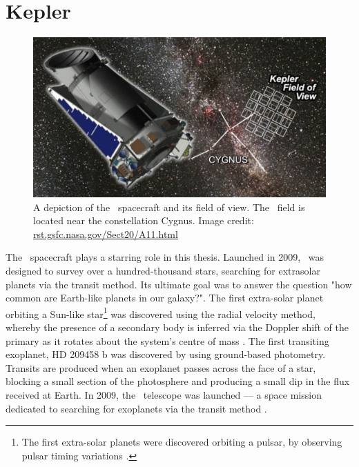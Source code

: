 \section{Kepler}

\begin{figure}[p]
\begin{center}
\includegraphics[width=6in, clip=true]{figures/kepler_pic.pdf}
\caption[The \kepler\ spacecraft and its field of view.]
{A depiction of the \kepler\ spacecraft and its field of view.
The \kepler\ field is located near the constellation Cygnus.
Image credit: \url{rst.gsfc.nasa.gov/Sect20/A11.html}}
\label{fig:current_fields}
\end{center}
\end{figure}

The \kepler\ spacecraft plays a starring role in this thesis.
Launched in 2009, \kepler\ was designed to survey over a hundred-thousand
stars, searching for extrasolar planets via the transit method.
Its ultimate goal was to answer the question "how common are Earth-like
planets in our galaxy?".
The first extra-solar planet orbiting a Sun-like star\footnote{The first
extra-solar planets were discovered orbiting a pulsar, by observing pulsar
timing variations \citep{Wolszczan1992}.}
was discovered using the radial velocity method, whereby the presence of a
secondary body is inferred via the Doppler shift of the primary as it rotates
about the system's centre of mass \citep{Mayor1995}.
The first transiting exoplanet, HD 209458 b was discovered by
\citet{Charbonneau2000} using ground-based photometry.
Transits are produced when an exoplanet passes across the face of a star,
blocking a small section of the photosphere and producing a small dip in the
flux received at Earth.
In 2009, the \kepler\ telescope was launched --- a space mission dedicated to
searching for exoplanets via the transit method \citep{Borucki2010}.

